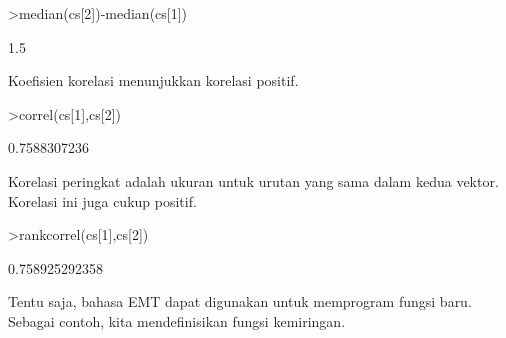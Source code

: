 \documentclass[a4paper,10pt]{article}
\begin{document}
\begin{eulernotebook}
\begin{eulercomment}
\begin{eulercomment}
\begin{eulercomment}
\begin{eulercomment}
\begin{eulerprompt}
>median(cs[2])-median(cs[1])
\end{eulerprompt}
\begin{euleroutput}
  1.5
\end{euleroutput}
\begin{eulercomment}
Koefisien korelasi menunjukkan korelasi positif.
\end{eulercomment}
\begin{eulerprompt}
>correl(cs[1],cs[2])
\end{eulerprompt}
\begin{euleroutput}
  0.7588307236
\end{euleroutput}
\begin{eulercomment}
Korelasi peringkat adalah ukuran untuk urutan yang sama dalam kedua
vektor. Korelasi ini juga cukup positif.
\end{eulercomment}
\begin{eulerprompt}
>rankcorrel(cs[1],cs[2])
\end{eulerprompt}
\begin{euleroutput}
  0.758925292358
\end{euleroutput}
\begin{eulercomment}
Tentu saja, bahasa EMT dapat digunakan untuk memprogram fungsi baru.
Sebagai contoh, kita mendefinisikan fungsi kemiringan.


\end{eulercomment}
\end{eulercomment}
\end{eulercomment}
\end{eulercomment}
\end{eulercomment}
\end{eulernotebook}
\end{document}
